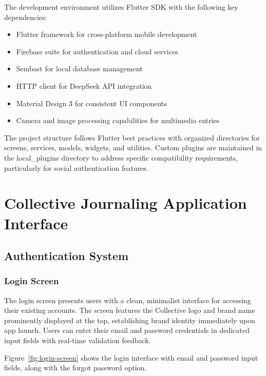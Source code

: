 The development environment utilizes Flutter SDK with the following key dependencies:
\begin{itemize}
    \item Flutter framework for cross-platform mobile development
    \item Firebase suite for authentication and cloud services
    \item Sembast for local database management
    \item HTTP client for DeepSeek API integration
    \item Material Design 3 for consistent UI components
    \item Camera and image processing capabilities for multimedia entries
\end{itemize}

The project structure follows Flutter best practices with organized directories for screens, services, models, widgets, and utilities. Custom plugins are maintained in the local\_plugins directory to address specific compatibility requirements, particularly for social authentication features.

\section{Collective Journaling Application Interface}

\subsection{Authentication System}

\subsubsection{Login Screen}

The login screen presents users with a clean, minimalist interface for accessing their existing accounts. The screen features the Collective logo and brand name prominently displayed at the top, establishing brand identity immediately upon app launch. Users can enter their email and password credentials in dedicated input fields with real-time validation feedback.

Figure~\ref{fig:login-screen} shows the login interface with email and password input fields, along with the forgot password option.

